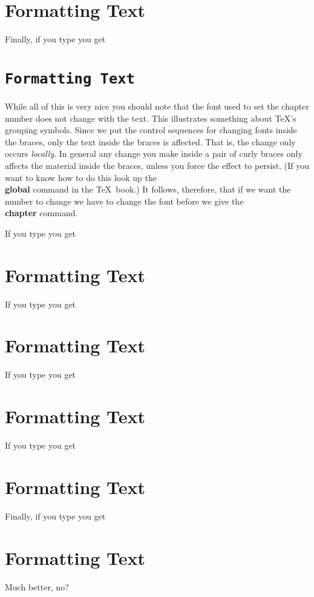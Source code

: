 \chapter{\caps Formatting Text}
Finally, if you type \recallchap
{}
you get
\chapter{\tt Formatting Text}
 
While all of this is very nice you should note that the font
used to set the chapter number does not change with the text.
This illustrates something about \TeX 's grouping symbols.
Since we put the control sequences for changing fonts inside the
braces, only the text inside the braces is affected.
That is, the change only occurs {\it locally}.
In general any change you make inside a pair of curly braces only
affects the material inside the braces, unless you force
the effect to persist.
(If you want to know how to do this look up the {\bf \\global}
command in the \TeX\ book.)
It follows, therefore, that if we want the number to change
we have to change the font before we give the {\bf \\chapter}
command.
 
\medbreak
If you type \recallchap
{}
you get
{\bf \chapter{Formatting Text}}
\endpage
If you type \recallchap
{}
you get
{\sl \chapter{ Formatting Text}}
\medbreak
If you type \recallchap
{}
you get
{\it \chapter{ Formatting Text}}
\goodbreak
If you type \recallchap
{}
you get
{\caps \chapter{ Formatting Text}}
\medbreak
Finally, if you type \recallchap
{}
you get
{\tt \chapter{ Formatting Text}}
\noindent Much better, no?
 

